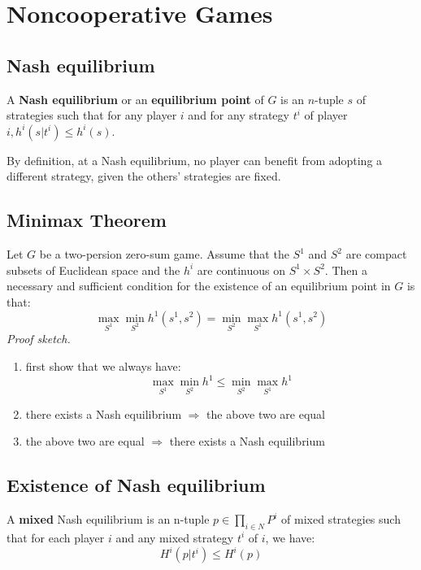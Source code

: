\documentclass[11pt,a4paper]{article}
\begin{document}
\section{Noncooperative Games}
\subsection{Nash equilibrium}
A \textbf{Nash equilibrium} or an \textbf{equilibrium point} of $G$ is an $n$-tuple $s$ of strategies such that for any player $i$ and for any strategy $t^i$ of player $i, h^i(s|t^i) \leqslant h^i(s)$. \par
By definition, at a Nash equilibrium, no player can benefit from adopting a different strategy, given the others' strategies are fixed. 

\subsection{Minimax Theorem}
Let $G$ be a two-persion zero-sum game. Assume that the $S^1$ and $S^2$ are compact subsets of Euclidean space and the $h^i$ are continuous on $S^1 \times S^2$. Then a necessary and sufficient condition for the existence of an equilibrium point in $G$ is that:
\[
\max_{S^1} \min_{S^2} h^1(s^1, s^2) = \min_{S^2} \max_{S^1} h^1(s^1, s^2)
\]
\textit{Proof sketch.}
\begin{enumerate}
    \item [(1)] first show that we always have:
        \[
        \max_{S^1} \min_{S^2} h^1 \leqslant \min_{S^2} \max_{S^1} h^1 
        \]
        
    \item [(2)] there exists a Nash equilibrium $\Rightarrow$ the above two are equal
    \item [(3)] the above two are equal $\Rightarrow$ there exists a Nash equilibrium
\end{enumerate}


\subsection{Existence of Nash equilibrium}
A \textbf{mixed} Nash equilibrium is an n-tuple $p \in \prod_{i \in N} P^i$ of mixed strategies such that for each player $i$ and any mixed strategy $t^i$ of $i$, we have:
\[
H^i(p|t^i) \leqslant H^i(p)
\]
\end{document}
